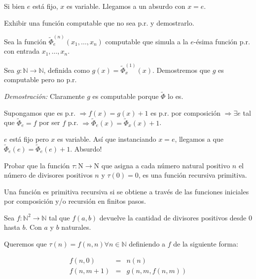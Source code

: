 \begin{questions}
\begin{solution}
Si bien $e$ est\'a fijo, $x$ es variable. Llegamos a un absurdo con $x=e$. 
\end{solution}

\question Exhibir una función computable que no sea p.r. y demostrarlo.


\begin{solution}

Sea la funci\'on $\tilde{\Phi}_e^{(n)}(x_1,\dots,x_n)$ computable que simula a la $e$-\'esima funci\'on p.r. con entrada $x_1, \dots, x_n$.

Sea $g : \mathbb{N} \rightarrow \mathbb{N}$, definida como $g(x) = \tilde{\Phi}_x^{(1)}(x)$. Demostremos que $g$ es computable pero no p.r.

{\it Demostraci\'on: } Claramente $g$ es computable porque $\tilde{\Phi}$ lo es. 

Supongamos que es p.r. $\Rightarrow f(x) = g(x)+1$ es p.r. por composici\'on $\Rightarrow \exists e$ tal que $\tilde{\Phi}_e = f$ por ser $f$ p.r. $\Rightarrow\tilde{\Phi}_e(x) = \tilde{\Phi}_x(x)+1$.

$e$ est\'a fijo pero $x$ es variable. As\'i que instanciando $x=e$, llegamos a que $\tilde{\Phi}_e(e) = \tilde{\Phi}_e(e)+1$. Absurdo!

\end{solution}

\question Probar que la funci\'on $\tau : \mathrm{N} \rightarrow \mathrm{N}$ que asigna a cada n\'umero natural positivo $n$ el n\'umero de divisores positivos $n$ y $\tau(0)=0$, es una funci\'on recursiva primitiva. 


\begin{solution}

Una función es primitiva recursiva si se obtiene a través de las funciones iniciales por composición y/o recursión en finitos pasos.

Sea $f:\mathbb{N}^2 \to \mathbb{N}$ tal que $f(a,b)$ devuelve la cantidad de divisores positivos desde $0$ hasta $b$. Con $a$ y $b$ naturales.

Queremos que $\tau(n) = f(n,n) \forall n \in \mathbb{N}$ definiendo a $f$ de la siguiente forma:

\begin{eqnarray*}
f(n,0)&=&n(n) \\
f(n,m+1)&=&g(n,m,f(n,m))
\end{eqnarray*}


\end{solution}
\end{questions}
